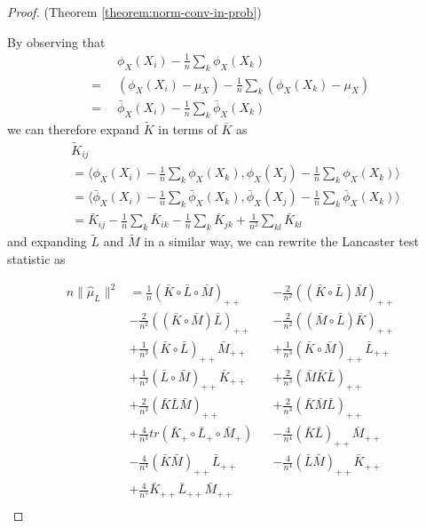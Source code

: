 \documentclass[]{article}
\begin{document}
\begin{proof}(Theorem \ref{theorem:norm-conv-in-prob})

By observing that
\begin{align*}
& \phi_X(X_i)- \frac{1}{n}\sum_k\phi_X(X_k) \\
= \enspace&  (\phi_X(X_i) - \mu_X) - \frac{1}{n}\sum_k (\phi_X(X_k) - \mu_X)\\
= \enspace&\bar\phi_X(X_i)- \frac{1}{n}\sum_k\bar\phi_X(X_k)
\end{align*}
we can therefore expand $\tilde{K}$ in terms of $\bar{K}$ as
\begin{align*}
&\tilde{K}_{ij} \\ 
&= \langle\phi_X(X_i)- \frac{1}{n}\sum_k\phi_X(X_k),\phi_X(X_j) - \frac{1}{n}\sum_k\phi_X(X_k)\rangle \\
&= \langle\bar\phi_X(X_i)- \frac{1}{n}\sum_k\bar\phi_X(X_k),\bar\phi_X(X_j) - \frac{1}{n}\sum_k\bar\phi_X(X_k)\rangle \\
&= \bar{K}_{ij} - \frac{1}{n}\sum_k\bar{K}_{ik} - \frac{1}{n}\sum_k\bar{K}_{jk} + \frac{1}{n^2}\sum_{kl}\bar{K}_{kl}
\end{align*}
and expanding $\tilde{L}$ and $\tilde{M}$ in a similar way, we can rewrite the Lancaster test statistic as

\begin{align*} 
n\|\hat \mu_L\|^2 &= 
\frac{1}{n}(\bar{K} \circ \bar{L}\circ \bar{M})_{++} &&-
\frac{2}{n^2}((\bar{K}\circ \bar{L}) \bar{M})_{++} \\&- 
\frac{2}{n^2}((\bar{K} \circ \bar{M}) \bar{L})_{++} &&- 
\frac{2}{n^2}((\bar{M} \circ \bar{L}) \bar{K})_{++} \\&+ 
\frac{1}{n^3}(\bar{K} \circ \bar{L})_{++} \bar{M}_{++} &&+ 
\frac{1}{n^3}(\bar{K} \circ \bar{M})_{++} \bar{L}_{++} \\&+ 
\frac{1}{n^3}(\bar{L} \circ \bar{M})_{++} \bar{K}_{++} &&+ 
\frac{2}{n^3}(\bar{M}\bar{K}\bar{L})_{++} \\&+ 
\frac{2}{n^3}(\bar{K}\bar{L}\bar{M})_{++} &&+ 
\frac{2}{n^3}(\bar{K}\bar{M}\bar{L})_{++} \\&+ 
\frac{4}{n^3}tr(\bar{K}_+ \circ \bar{L}_+ \circ \bar{M}_+) &&-
\frac{4}{n^4}(\bar{K} \bar{L})_{++} \bar{M}_{++} \\& - 
\frac{4}{n^4}(\bar{K}\bar{M})_{++}\bar{L}_{++} &&- 
\frac{4}{n^4}(\bar{L}\bar{M})_{++} \bar{K}_{++} \\&+
\frac{4}{n^5}\bar{K}_{++} \bar{L}_{++} \bar{M}_{++} \\
\end{align*}


\end{proof}
\end{document}
